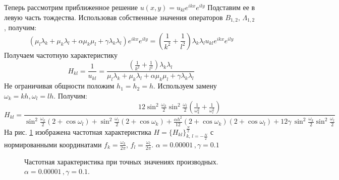 \documentclass{article}
\begin{document}
Теперь рассмотрим приближенное решение $u(x,y) = u_{kl} e^{ikx}e^{ily}$
Подставим ее в левую часть тождества. Использовав собственные значения
операторов $B_{1,2} ,\,\Lambda_{1,2}$ , получим:
\begin{equation}
(\mu_l \lambda_k + \mu_k \lambda_l + \alpha \mu_k \mu_l + \gamma \lambda_k \lambda_l)e^{ikx}e^{ily} = (\frac{1}{k^2} + \frac{1}{l^2})\lambda_k\lambda_lu_{kl}e^{ikx}e^{ily}
\end{equation}
Получаем частотную характеристику
\begin{equation}
H_{kl} = \frac{1}{u_{kl}} = \frac{(\frac{1}{k^2} + \frac{1}{l^2})\lambda_k\lambda_l}{\mu_l \lambda_k + \mu_k \lambda_l + \alpha \mu_k \mu_l + \gamma \lambda_k \lambda_l}
\end{equation}
Не ограничивая общности положим $h_1 = h_2 = h$. Используем замену $\omega_k = kh, \omega_l = lh$. Получим:
\begin{equation}
H_{kl} = \frac{12 \sin^2\frac{\omega_k}{2}  \sin^2\frac{\omega_l}{2}(\frac{1}{\omega_k^2} + \frac{1}{\omega_l^2}) }
            { \sin^2\frac{\omega_k}{2}(2 +  \cos\omega_l) +  \sin^2\frac{\omega_l}{2}(2  +  \cos\omega_k) + \frac{\alpha h^2}{12}(2 +  \cos\omega_k)(2 +  \cos\omega_l) + 12\gamma \, \sin^2\frac{\omega_k}{2}  \sin^2\frac{\omega_l}{2}}
\end{equation}
На рис. \ref{ris:cont_plt} изображена частотная характеристика $H=\{H_{kl}\}^{\frac{N}{2}}_{k,\,l=-\frac{N}{2}}$ с нормированными координатами $f_k = \frac{\omega_k}{2\pi} ,\, f_l = \frac{\omega_l}{2\pi}$. $\alpha = 0.00001\,,\gamma = 0.1$
\begin{figure}[H]
\caption{Частотная характеристика при точных значениях производных. $\alpha = 0.00001\,,\gamma = 0.1$.}
\label{ris:cont_plt}
\end{figure}
\end{document}
